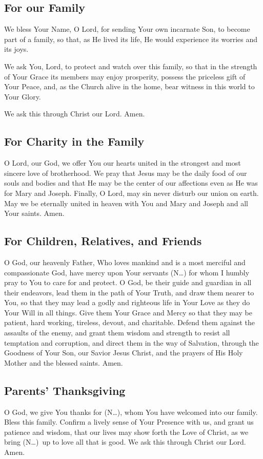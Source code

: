\documentclass[12pt]{article}
\newcommand{\prayertitle}[1]{\subsection{#1}}
\newcommand{\insertname}{(N\dots)\xspace}
\begin{document}
\prayertitle{For our Family}
We bless Your Name, O Lord, for sending Your own incarnate Son, to become part of a family, so that, as He lived its life, He would experience its worries and its joys.

We ask You, Lord, to protect and watch over this family, so that in the strength of Your Grace its members may enjoy prosperity, possess the priceless gift of Your Peace, and, as the Church alive in the home, bear witness in this world to Your Glory.

We ask this through Christ our Lord.
Amen.
\newpage
\prayertitle{For Charity in the Family}
O Lord, our God, we offer You our hearts united in the strongest and most sincere love of brotherhood.
We pray that Jesus may be the daily food of our souls and bodies and that He may be the center of our affections even as He was for Mary and Joseph.
Finally, O Lord, may sin never disturb our union on earth.
May we be eternally united in heaven with You and Mary and Joseph and all Your saints.
Amen.

\prayertitle{For Children, Relatives, and Friends}
O God, our heavenly Father, Who loves mankind and is a most merciful and compassionate God, have mercy upon Your servants \insertname for whom I humbly pray to You to care for and protect.
O God, be their guide and guardian in all their endeavors, lead them in the path of Your Truth, and draw them nearer to You, so that they may lead a godly and righteous life in Your Love as they do Your Will in all things.
Give them Your Grace and Mercy so that they may be patient, hard working, tireless, devout, and charitable.
Defend them against the assaults of the enemy, and grant them wisdom and strength to resist all temptation and corruption, and direct them in the way of Salvation, through the Goodness of Your Son, our Savior Jesus Christ, and the prayers of His Holy Mother and the blessed saints.
Amen.

\prayertitle{Parents' Thanksgiving}
O God, we give You thanks for \insertname, whom You have welcomed into our family.
Bless this family.
Confirm a lively sense of Your Presence with us, and grant us patience and wisdom, that our lives may show forth the Love of Christ, as we bring \insertname\ up to love all that is good.
We ask this through Christ our Lord.
Amen.
\end{document}
